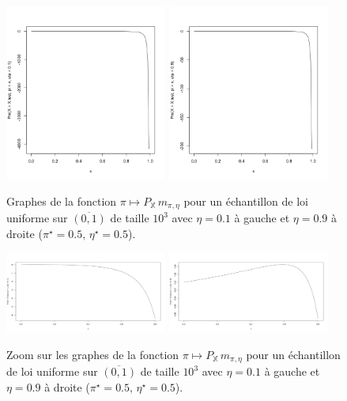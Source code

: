 \documentclass{article}
\begin{document}
    \begin{figure}[H]
        \includegraphics[width=0.475\textwidth]{img/Pm_3.png}
        \hspace{\fill}
        \includegraphics[width=0.475\textwidth]{img/Pm_3bis.png}
        \caption{Graphes de la fonction $\pi\mapsto{}P_\mathbb{X}\,m_{\pi,\eta}$ pour un échantillon de loi uniforme sur $\overline{(0,1)}$ de taille $10^3$ avec $\eta=0.1$ à gauche et $\eta=0.9$ à droite ($\pi^\star=0.5,\,\eta^\star=0.5$).}
    \end{figure}

    \begin{figure}[H]
        \includegraphics[width=0.475\textwidth]{img/zoom_2.png}
        \hspace{\fill}
        \includegraphics[width=0.475\textwidth]{img/zoom_3.png}
        \caption{Zoom sur les graphes de la fonction $\pi\mapsto{}P_\mathbb{X}\,m_{\pi,\eta}$ pour un échantillon de loi uniforme sur $\overline{(0,1)}$ de taille $10^3$ avec $\eta=0.1$ à gauche et $\eta=0.9$ à droite ($\pi^\star=0.5,\,\eta^\star=0.5$).}
    \end{figure}
\end{document}
